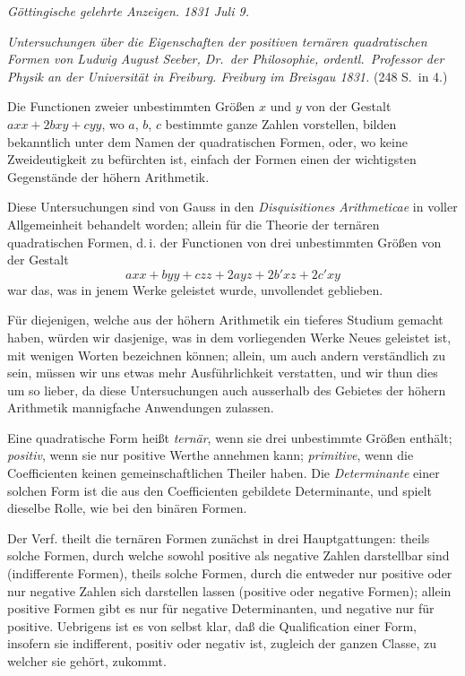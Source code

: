 \documentclass[12pt,a4paper]{article}
\theoremstyle{plain}
\theoremstyle{definition}
\theoremstyle{remark}
\begin{document}
\textit{Göttingische gelehrte Anzeigen. 1831 Juli 9.}

\textit{Untersuchungen über die Eigenschaften der positiven ternären quadratischen Formen von Ludwig August Seeber, Dr.\ der Philosophie, ordentl.\ Professor der Physik an der Universität in Freiburg. Freiburg im Breisgau 1831.} (248 S.\ in 4.)

Die Functionen zweier unbestimmten Größen $x$ und $y$ von der Gestalt $axx + 2bxy + cyy$, wo $a$, $b$, $c$ bestimmte ganze Zahlen vorstellen, bilden bekanntlich unter dem Namen der quadratischen Formen, oder, wo keine Zweideutigkeit zu befürchten ist, einfach der Formen einen der wichtigsten Gegenstände der höhern Arithmetik.

Diese Untersuchungen sind von Gauss in den \textit{Disquisitiones Arithmeticae} in voller Allgemeinheit behandelt worden; allein für die Theorie der ternären quadratischen Formen, d.\,i. der Functionen von drei unbestimmten Größen von der Gestalt
\[
axx + byy + czz + 2ayz + 2b'xz + 2c'xy
\]
war das, was in jenem Werke geleistet wurde, unvollendet geblieben.

Für diejenigen, welche aus der höhern Arithmetik ein tieferes Studium gemacht haben, würden wir dasjenige, was in dem vorliegenden Werke Neues geleistet ist, mit wenigen Worten bezeichnen können; allein, um auch andern verständlich zu sein, müssen wir uns etwas mehr Ausführlichkeit verstatten, und wir thun dies um so lieber, da diese Untersuchungen auch ausserhalb des Gebietes der höhern Arithmetik mannigfache Anwendungen zulassen.

Eine quadratische Form heißt \textit{ternär}, wenn sie drei unbestimmte Größen enthält; \textit{positiv}, wenn sie nur positive Werthe annehmen kann; \textit{primitive}, wenn die Coefficienten keinen gemeinschaftlichen Theiler haben. Die \textit{Determinante} einer solchen Form ist die aus den Coefficienten gebildete Determinante, und spielt dieselbe Rolle, wie bei den binären Formen.

Der Verf. theilt die ternären Formen zunächst in drei Hauptgattungen: theils solche Formen, durch welche sowohl positive als negative Zahlen darstellbar sind (indifferente Formen), theils solche Formen, durch die entweder nur positive oder nur negative Zahlen sich darstellen lassen (positive oder negative Formen); allein positive Formen gibt es nur für negative Determinanten, und negative nur für positive. Uebrigens ist es von selbst klar, daß die Qualification einer Form, insofern sie indifferent, positiv oder negativ ist, zugleich der ganzen Classe, zu welcher sie gehört, zukommt.
\end{document}
